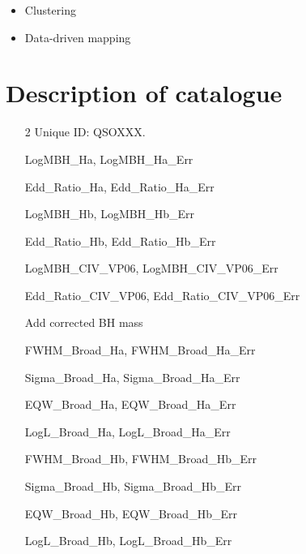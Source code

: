 \begin{itemize}
\item Clustering
\item Data-driven mapping
\end{itemize}

\section{Description of catalogue}

\begin{itemize}
    
  \item[2] Unique ID: QSOXXX.

  \item[] LogMBH\_Ha, LogMBH\_Ha\_Err

  \item[] Edd\_Ratio\_Ha, Edd\_Ratio\_Ha\_Err

  \item[] LogMBH\_Hb, LogMBH\_Hb\_Err

  \item[] Edd\_Ratio\_Hb, Edd\_Ratio\_Hb\_Err

  \item[] LogMBH\_CIV\_VP06, LogMBH\_CIV\_VP06\_Err

  \item[] Edd\_Ratio\_CIV\_VP06, Edd\_Ratio\_CIV\_VP06\_Err

  \item[] Add corrected BH mass 

  \item[] FWHM\_Broad\_Ha, FWHM\_Broad\_Ha\_Err

  \item[] Sigma\_Broad\_Ha, Sigma\_Broad\_Ha\_Err

  \item[] EQW\_Broad\_Ha, EQW\_Broad\_Ha\_Err

  \item[] LogL\_Broad\_Ha, LogL\_Broad\_Ha\_Err

  \item[] FWHM\_Broad\_Hb, FWHM\_Broad\_Hb\_Err

  \item[] Sigma\_Broad\_Hb, Sigma\_Broad\_Hb\_Err

  \item[] EQW\_Broad\_Hb, EQW\_Broad\_Hb\_Err
 
  \item[] LogL\_Broad\_Hb, LogL\_Broad\_Hb\_Err


\end{itemize}
